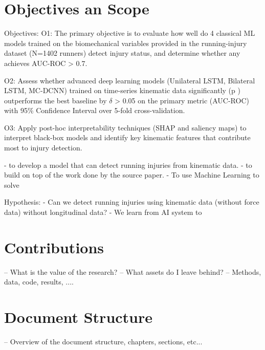 \section{Objectives an Scope}\label{sec:intro-objectives-scope}
Objectives:
O1: The primary objective is to evaluate how well do 4 classical ML models trained on the biomechanical variables provided in the running-injury dataset (N=1402 runners) detect injury status, and determine whether any achieves AUC-ROC > 0.7.

O2: Assess whether advanced deep learning models (Unilateral LSTM, Bilateral LSTM, MC-DCNN) trained on time-series kinematic data significantly (p ) outperforms the best baseline by \(\delta\) > 0.05 on the primary metric (AUC-ROC) with 95\% Confidence Interval over 5-fold cross-validation.

O3: Apply post-hoc interpretability techniques (SHAP and saliency maps) to interpret black-box models and identify key kinematic features that contribute most to injury detection.












- to develop a model that can detect running injuries from kinematic data.
- to build on top of the work done by the source paper.
- To use Machine Learning to solve 


Hypothesis:
- Can we detect running injuries using kinematic data (without force data) without longitudinal data?
- We learn from AI system to 

\section{Contributions}\label{sec:intro-contributions}
-- What is the value of the research?
-- What assets do I leave behind?
-- Methods, data, code, results, ....

\section{Document Structure}\label{sec:intro-structure}
-- Overview of the document structure, chapters, sections, etc...
